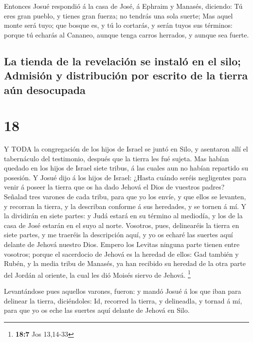  Entonces Josué respondió á la casa de José, á Ephraim y
Manasés, diciendo: Tú eres gran pueblo, y tienes gran fuerza; no tendrás
una sola suerte;  Mas aquel monte será tuyo; que bosque es,
y tú lo cortarás, y serán tuyos sus términos: porque tú echarás al
Cananeo, aunque tenga carros herrados, y aunque sea fuerte.

\hypertarget{la-tienda-de-la-revelaciuxf3n-se-instaluxf3-en-el-silo-admisiuxf3n-y-distribuciuxf3n-por-escrito-de-la-tierra-auxfan-desocupada}{%
\subsection{La tienda de la revelación se instaló en el silo; Admisión y
distribución por escrito de la tierra aún
desocupada}\label{la-tienda-de-la-revelaciuxf3n-se-instaluxf3-en-el-silo-admisiuxf3n-y-distribuciuxf3n-por-escrito-de-la-tierra-auxfan-desocupada}}

\hypertarget{section-17}{%
\section{18}\label{section-17}}

 Y TODA la congregación de los hijos de Israel se juntó en
Silo, y asentaron allí el tabernáculo del testimonio, después que la
tierra les fué sujeta.  Mas habían quedado en los hijos de
Israel siete tribus, á las cuales aun no habían repartido su posesión.
 Y Josué dijo á los hijos de Israel: ¿Hasta cuándo seréis
negligentes para venir á poseer la tierra que os ha dado Jehová el Dios
de vuestros padres?  Señalad tres varones de cada tribu,
para que yo los envíe, y que ellos se levanten, y recorran la tierra, y
la describan conforme á sus heredades, y se tornen á mí.  Y
la dividirán en siete partes: y Judá estará en su término al mediodía, y
los de la casa de José estarán en el suyo al norte. 
Vosotros, pues, delinearéis la tierra en siete partes, y me traeréis la
descripción aquí, y yo os echaré las suertes aquí delante de Jehová
nuestro Dios.  Empero los Levitas ninguna parte tienen entre
vosotros; porque el sacerdocio de Jehová es la heredad de ellos: Gad
también y Rubén, y la media tribu de Manasés, ya han recibido su heredad
de la otra parte del Jordán al oriente, la cual les dió Moisés siervo de
Jehová. \footnote{\textbf{18:7} Jos 13,14-33}

 Levantándose pues aquellos varones, fueron: y mandó Josué á
los que iban para delinear la tierra, diciéndoles: Id, recorred la
tierra, y delineadla, y tornad á mí, para que yo os eche las suertes
aquí delante de Jehová en Silo.

